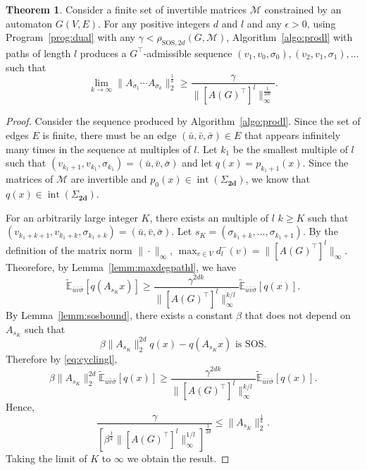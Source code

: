 \documentclass{sig-alternate-05-2015}
\DeclareMathOperator{\inte}{int}
\newcommand{\1}{\mathbf{1}}
\newcommand{\Sh}{\Sigma_{\mathbf{2d}}}
\newcommand{\din}{d^{-}}
\theoremstyle{definition}
\newtheorem{mytheo}{Theorem}
\newcommand{\Tr}{\top}
\newcommand{\A}{\mathcal{M}}
\newcommand{\G}{G}
\newcommand{\jsrsos}[1][2d]{\rho_{\mathrm{SOS},#1}(\G,\A)}
\newcommand{\pE}{\widetilde{\mathbb{E}}}
\newcommand{\Nodes}{V}
\newcommand{\Arcs}{E}
\newcommand{\arc}{edge}
\newcommand{\arcs}{edges}
\newcommand{\defAGie  }{a finite set of invertible matrices $\A$ constrained by an automaton $\G(\Nodes,\Arcs)$}
\begin{document}
\begin{mytheo}
  \label{theo:fourth}
  Consider \defAGie.
  For any positive integers $d$ and $l$
  and any $\epsilon > 0$,
  using Program~\ref{prog:dual} with any $\gamma < \jsrsos$,
  Algorithm~\ref{algo:prodl} with paths of length $l$ produces a $\G^\Tr $-admissible sequence
  $(v_1,v_0,\sigma_0),\allowbreak(v_2,v_1,\sigma_1), \ldots$
  such that
  \begin{equation}
    \lim_{k \to \infty} \|A_{\sigma_1} \cdots A_{\sigma_k}\|_2^{\frac{1}{k}} \geq \frac{\gamma}{\|[A(\G)^\Tr ]^l\|_\infty^{\frac{1}{2dl}}}.
  \end{equation}
  \begin{proof}
    Consider the sequence produced by Algorithm~\ref{algo:prodl}.
    Since the set of \arcs{} $\Arcs$ is finite,
    there must be an \arc{} $(\bar{u},\bar{v},\bar{\sigma}) \in \Arcs$ that appears infinitely many times in the sequence
    at multiples of $l$.
    Let $k_1$ be the smallest multiple of $l$ such that $(v_{k_1+1},v_{k_1},\sigma_{k_1}) = (\bar{u},\bar{v},\bar{\sigma})$ and
    let $q(x) = p_{k_1+1}(x)$.
    Since the matrices of $\A$ are invertible and $p_0(x) \in \inte(\Sh)$, we know that $q(x) \in \inte(\Sh)$.

    For an arbitrarily large integer $K$, there exists an multiple of $l$ $k \geq K$ such that $(v_{k_1+k+1},v_{k_1+k}, \sigma_{k_1+k}) = (\bar{u},\bar{v},\bar{\sigma})$.
    Let $s_K = (\sigma_{k_1+k}, \ldots, \sigma_{k_1+1})$.
    By the definition of the matrix norm $\|\cdot\|_\infty$, $\max_{v \in \Nodes} \din_l(v) = \|[A(\G)^\Tr ]^l\|_\infty$.
    Theorefore, by Lemma~\ref{lemm:maxdegpathl}, we have
    \begin{equation}
      \label{eq:cyclingl}
      \pE_{\bar{u}\bar{v}\bar{\sigma}}[q(A_{s_K} x)] \geq \frac{\gamma^{2dk}}{\|[A(\G)^\Tr ]^{l}\|_\infty^{k/l}} \pE_{\bar{u}\bar{v}\bar{\sigma}}[q(x)].
    \end{equation}
    By Lemma~\ref{lemm:sosbound}, there exists a constant $\beta$ that does not depend on $A_{s_K}$ such that%
    \[ \beta \|A_{s_K}\|_2^{2d}q(x) - q(A_{s_K} x) \text{ is SOS}. \]
    Therefore by \eqref{eq:cyclingl},
    \[ \beta \|A_{s_K}\|_2^{2d}\pE_{\bar{u}\bar{v}\bar{\sigma}}[q(x)] \geq \frac{\gamma^{2dk}}{\|[A(\G)^\Tr ]^{l}\|_\infty^{k/l}} \pE_{\bar{u}\bar{v}\bar{\sigma}}[q(x)]. \]
    Hence,
    \[ \frac{\gamma}{[\beta^{\frac{1}{k}} \|[A(\G)^\Tr ]^{l}\|_\infty^{1/l}]^{\frac{1}{2d}}} \leq \|A_{s_K}\|_2^{\frac{1}{k}}. \]
    Taking the limit of $K$ to $\infty$ we obtain the result.
  \end{proof}
\end{mytheo}
\end{document}
